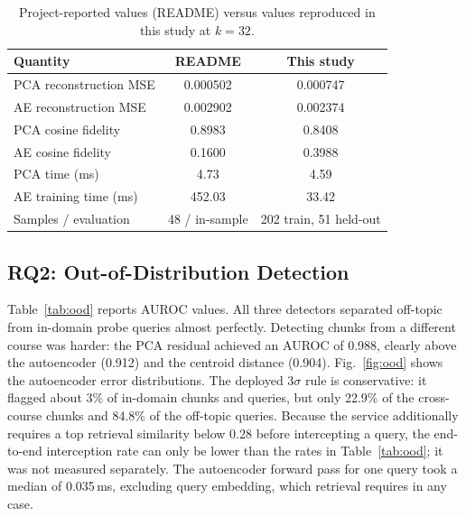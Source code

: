 \documentclass[conference]{IEEEtran}
\begin{document}
\begin{table}[!t]
\centering
\caption{Project-reported values (README) versus values reproduced in this study at $k=32$.}
\label{tab:repro}
\footnotesize
\setlength{\tabcolsep}{4pt}
\begin{tabular}{lcc}
\toprule
Quantity & README & This study \\
\midrule
PCA reconstruction MSE & 0.000502 & 0.000747 \\
AE reconstruction MSE & 0.002902 & 0.002374 \\
PCA cosine fidelity & 0.8983 & 0.8408 \\
AE cosine fidelity & 0.1600 & 0.3988 \\
PCA time (ms) & 4.73 & 4.59 \\
AE training time (ms) & 452.03 & 33.42 \\
Samples / evaluation & 48 / in-sample & 202 train, 51 held-out \\
\bottomrule
\end{tabular}
\end{table}
\subsection{RQ2: Out-of-Distribution Detection}
Table~\ref{tab:ood} reports AUROC values. All three detectors separated off-topic from in-domain probe queries almost perfectly. Detecting chunks from a different course was harder: the PCA residual achieved an AUROC of 0.988, clearly above the autoencoder (0.912) and the centroid distance (0.904). Fig.~\ref{fig:ood} shows the autoencoder error distributions. The deployed $3\sigma$ rule is conservative: it flagged about 3\% of in-domain chunks and queries, but only 22.9\% of the cross-course chunks and 84.8\% of the off-topic queries. Because the service additionally requires a top retrieval similarity below 0.28 before intercepting a query, the end-to-end interception rate can only be lower than the rates in Table~\ref{tab:ood}; it was not measured separately. The autoencoder forward pass for one query took a median of 0.035\,ms, excluding query embedding, which retrieval requires in any case.
\end{document}

